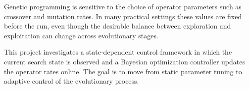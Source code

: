 Genetic programming is sensitive to the choice of operator parameters such
as crossover and mutation rates. In many practical settings these values
are fixed before the run, even though the desirable balance between
exploration and exploitation can change across evolutionary stages.

This project investigates a state-dependent control framework in which the
current search state is observed and a Bayesian optimization controller
updates the operator rates online. The goal is to move from static
parameter tuning to adaptive control of the evolutionary process.
